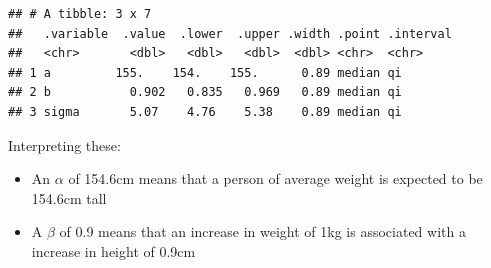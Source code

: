 \documentclass[
]{book}
\newenvironment{Shaded}{\begin{snugshade}}{\end{snugshade}}
\newcommand{\AttributeTok}[1]{\textcolor[rgb]{0.77,0.63,0.00}{#1}}
\newcommand{\DecValTok}[1]{\textcolor[rgb]{0.00,0.00,0.81}{#1}}
\newcommand{\FloatTok}[1]{\textcolor[rgb]{0.00,0.00,0.81}{#1}}
\newcommand{\FunctionTok}[1]{\textcolor[rgb]{0.00,0.00,0.00}{#1}}
\newcommand{\NormalTok}[1]{#1}
\newcommand{\OtherTok}[1]{\textcolor[rgb]{0.56,0.35,0.01}{#1}}
\newcommand{\SpecialCharTok}[1]{\textcolor[rgb]{0.00,0.00,0.00}{#1}}
\providecommand{\tightlist}{%
  \setlength{\itemsep}{0pt}\setlength{\parskip}{0pt}}
\begin{document}
\begin{Shaded}
\end{Shaded}

\begin{verbatim}
## # A tibble: 3 x 7
##   .variable  .value  .lower  .upper .width .point .interval
##   <chr>       <dbl>   <dbl>   <dbl>  <dbl> <chr>  <chr>    
## 1 a         155.    154.    155.      0.89 median qi       
## 2 b           0.902   0.835   0.969   0.89 median qi       
## 3 sigma       5.07    4.76    5.38    0.89 median qi
\end{verbatim}

Interpreting these:

\begin{itemize}
\tightlist
\item
  An \(\alpha\) of 154.6cm means that a person of average weight is expected to be 154.6cm tall
\item
  A \(\beta\) of 0.9 means that an increase in weight of 1kg is associated with a increase in height of 0.9cm
\end{itemize}
\end{document}

